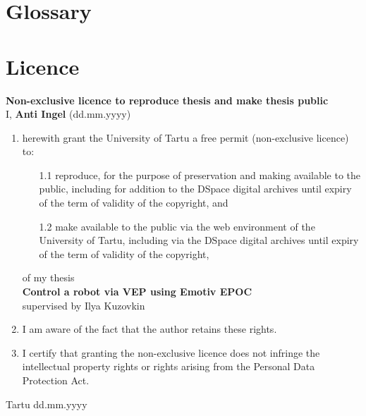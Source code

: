 
\begin{appendices}
\renewcommand{\thechapter}{\Roman{chapter}}
\chapter{Glossary}
\printglossary
\chapter{Licence}
\textbf{Non-exclusive licence to reproduce thesis and make thesis public}\\[1cm]

\noindent I, \textbf{Anti Ingel} (dd.mm.yyyy)

\begin{enumerate}
	\item herewith grant the University of Tartu a free permit (non-exclusive licence) to:
	\begin{enumerate}
		\item[1.1] reproduce, for the purpose of preservation and making available to the public, including for addition to the DSpace digital archives until expiry of the term of validity of the copyright, and
		\item[1.2] make available to the public via the web environment of the University of Tartu, including via the DSpace digital archives until expiry of the term of validity of the copyright,
	\end{enumerate}
	of my thesis\\
	\textbf{Control a robot via VEP using Emotiv EPOC}\\
	supervised by Ilya Kuzovkin
	\item I am aware of the fact that the author retains these rights.
	\item I certify that granting the non-exclusive licence does not infringe the intellectual property rights or rights arising from the Personal Data Protection Act.
\end{enumerate}
\vspace{1cm}
Tartu dd.mm.yyyy


\end{appendices}